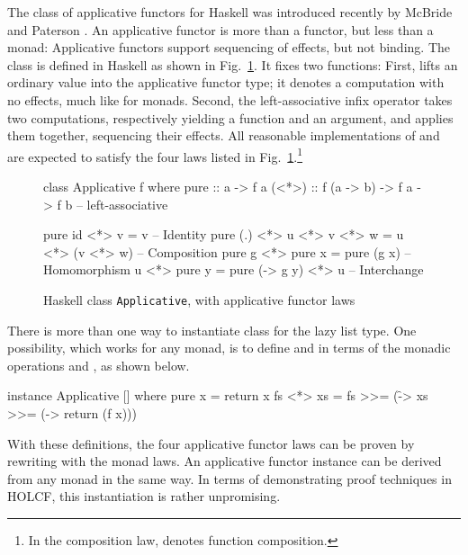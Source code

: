 The class of applicative functors for Haskell was introduced recently by McBride and Paterson \cite{McBride08}. An applicative functor is more than a functor, but less than a monad: Applicative functors support sequencing of effects, but not binding. The class is defined in Haskell as shown in Fig.~\ref{fig:case-applicative-laws}. It fixes two functions: First,  lifts an ordinary value into the applicative functor type; it denotes a computation with no effects, much like  for monads. Second, the left-associative infix operator \hs{(<*>)} takes two computations, respectively yielding a function and an argument, and applies them together, sequencing their effects. All reasonable implementations of  and \hs{(<*>)} are expected to satisfy the four laws listed in Fig.~\ref{fig:case-applicative-laws}.\footnote{In the composition law,  denotes function composition.}

\begin{figure}
\begin{hscode}
class Applicative f where
  pure :: a -> f a
  (<*>) :: f (a -> b) -> f a -> f b   -- left-associative
\end{hscode}
\begin{hscode}
             pure id <*> v = v                      -- Identity
pure (.) <*> u <*> v <*> w = u <*> (v <*> w)        -- Composition
         pure g <*> pure x = pure (g x)             -- Homomorphism
              u <*> pure y = pure (\g -> g y) <*> u -- Interchange
\end{hscode}
\caption{Haskell class \texttt{Applicative}, with applicative functor laws}
\label{fig:case-applicative-laws}
\end{figure}

There is more than one way to instantiate class  for the lazy list type. One possibility, which works for any monad, is to define  and \hs{(<*>)} in terms of the monadic operations  and \hs{(>{}>=)}, as shown below.
%
\begin{hscode}
instance Applicative [] where
  pure x = return x
  fs <*> xs = fs >>= (\f -> xs >>= (\x -> return (f x)))
\end{hscode}
%
With these definitions, the four applicative functor laws can be proven by rewriting with the monad laws. An applicative functor instance can be derived from any monad in the same way. In terms of demonstrating proof techniques in HOLCF, this instantiation is rather unpromising.

